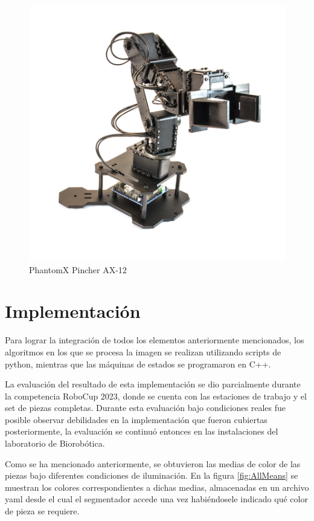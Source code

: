             \begin{figure}[H]
                \centering
                \includegraphics[scale=0.2]{Figures/Phantom_Pincher.jpg}
                    \caption{PhantomX Pincher AX-12 \cite{Inerbotix_pincher_arm}}
                    \label{fig:Phantom_Pincher}
            \end{figure}

\section{Implementación}
Para lograr la integración de todos los elementos anteriormente mencionados, los algoritmos en los que se procesa la imagen se realizan utilizando scripts de python, mientras que las máquinas de estados se programaron en C++.

La evaluación del resultado de esta implementación se dio parcialmente durante la competencia RoboCup 2023, donde se cuenta con las estaciones de trabajo y el set de piezas completas. Durante esta evaluación bajo condiciones reales fue posible observar debilidades en la implementación que fueron cubiertas posteriormente, la evaluación se continuó entonces en las instalaciones del laboratorio de Biorobótica. 

Como se ha mencionado anteriormente, se obtuvieron las medias de color de las piezas bajo diferentes condiciones de iluminación. En la figura \ref{fig:AllMeans} se muestran los colores correspondientes a dichas medias, almacenadas en un archivo yaml desde el cual el segmentador accede una vez habiéndosele indicado qué color de pieza se requiere. 

